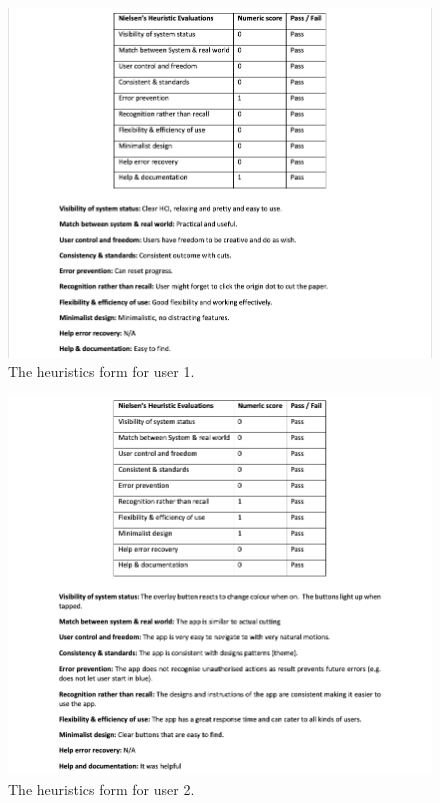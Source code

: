 \documentclass[11pt]{article}
\begin{document}
    \begin{figure}[!ht]
            \centering
            \includegraphics[width=1\linewidth]{Images/User1.png}
            \caption{The heuristics form for user 1.}
            \label{fig:user1}
    \end{figure}
    \begin{figure}[!ht]
            \centering
            \includegraphics[width=1\linewidth]{Images/User2.png}
            \caption{The heuristics form for user 2.}
            \label{fig:user2}
    \end{figure}    
\end{document}
